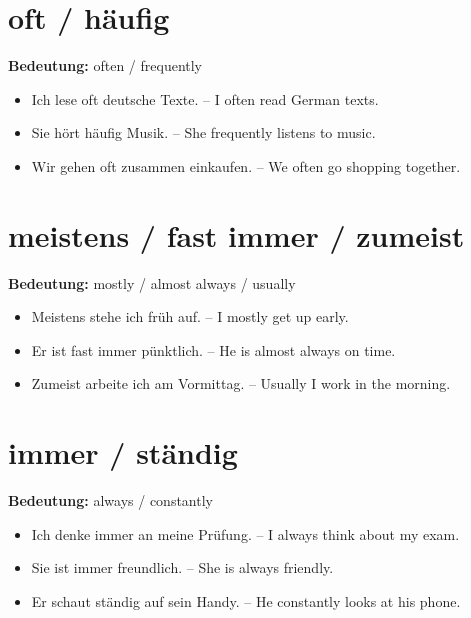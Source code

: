 \documentclass[a4paper]{article}
\begin{document}
        \section{oft / häufig}
            
            \textbf{Bedeutung:} often / frequently
            
            \begin{itemize}
                \item Ich lese oft deutsche Texte. -- I often read German texts.
                \item Sie hört häufig Musik. -- She frequently listens to music.
                \item Wir gehen oft zusammen einkaufen. -- We often go shopping together.
            \end{itemize}
        
        \section{meistens / fast immer / zumeist}
            
            \textbf{Bedeutung:} mostly / almost always / usually
            
            \begin{itemize}
                \item Meistens stehe ich früh auf. -- I mostly get up early.
                \item Er ist fast immer pünktlich. -- He is almost always on time.
                \item Zumeist arbeite ich am Vormittag. -- Usually I work in the morning.
            \end{itemize}
        
        \section{immer / ständig}
            
            \textbf{Bedeutung:} always / constantly
            
            \begin{itemize}
                \item Ich denke immer an meine Prüfung. -- I always think about my exam.
                \item Sie ist immer freundlich. -- She is always friendly.
                \item Er schaut ständig auf sein Handy. -- He constantly looks at his phone.
            \end{itemize}
%            
%            
\end{document}
